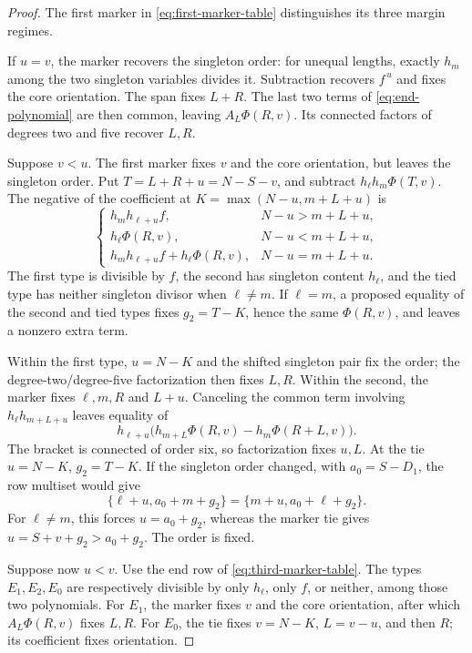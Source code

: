 \documentclass[11pt,a4paper]{amsart}
\numberwithin{equation}{section}
\theoremstyle{plain}
\theoremstyle{definition}
\begin{document}
\begin{proof}
The first marker in \eqref{eq:first-marker-table} distinguishes its three margin regimes.

If \(u=v\), the marker recovers the singleton order: for unequal lengths, exactly \(h_m\) among the two singleton variables divides it.  Subtraction recovers \(f^{\,u}\) and fixes the core orientation.  The span fixes \(L+R\).  The last two terms of \eqref{eq:end-polynomial} are then common, leaving \(A_L\Phi(R,v)\).  Its connected factors of degrees two and five recover \(L,R\).

Suppose \(v<u\).  The first marker fixes \(v\) and the core orientation, but leaves the singleton order.  Put \(T=L+R+u=N-S-v\), and subtract \(h_\ell h_m\Phi(T,v)\).  The negative of the coefficient at \(K=\max(N-u,m+L+u)\) is
\begin{equation}\label{eq:end-bottom-marker}
 \begin{cases}
 h_mh_{\ell+u}f,&N-u>m+L+u,\\
 h_\ell\Phi(R,v),&N-u<m+L+u,\\
 h_mh_{\ell+u}f+h_\ell\Phi(R,v),&N-u=m+L+u.
 \end{cases}
\end{equation}
The first type is divisible by \(f\), the second has singleton content \(h_\ell\), and the tied type has neither singleton divisor when \(\ell\ne m\).  If \(\ell=m\), a proposed equality of the second and tied types fixes \(g_2=T-K\), hence the same \(\Phi(R,v)\), and leaves a nonzero extra term.

Within the first type, \(u=N-K\) and the shifted singleton pair fix the order; the degree-two/degree-five factorization then fixes \(L,R\).  Within the second, the marker fixes \(\ell,m,R\) and \(L+u\).  Canceling the common term involving \(h_\ell h_{m+L+u}\) leaves equality of
\[
 h_{\ell+u}\bigl(h_{m+L}\Phi(R,v)-h_m\Phi(R+L,v)\bigr).
\]
The bracket is connected of order six, so factorization fixes \(u,L\).  At the tie \(u=N-K\), \(g_2=T-K\).  If the singleton order changed, with \(a_0=S-D_1\), the row multiset would give
\[
 \{\ell+u,a_0+m+g_2\}=\{m+u,a_0+\ell+g_2\}.
\]
For \(\ell\ne m\), this forces \(u=a_0+g_2\), whereas the marker tie gives \(u=S+v+g_2>a_0+g_2\).  The order is fixed.

Suppose now \(u<v\).  Use the end row of \eqref{eq:third-marker-table}.  The types \(E_1,E_2,E_0\) are respectively divisible by only \(h_\ell\), only \(f\), or neither, among those two polynomials.  For \(E_1\), the marker fixes \(v\) and the core orientation, after which \(A_L\Phi(R,v)\) fixes \(L,R\).  For \(E_0\), the tie fixes \(v=N-K\), \(L=v-u\), and then \(R\); its coefficient fixes orientation.


\end{proof}
\end{document}
